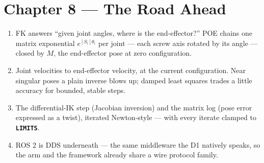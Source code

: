 \documentclass[11pt,twoside,openright]{book}
\newcommand{\code}[1]{\texttt{\bfseries #1}}
\begin{document}
\section{Chapter 8 --- The Road Ahead}

\begin{enumerate}
  \item FK answers ``given joint angles, where is the end-effector?''
    POE chains one matrix exponential $e^{[S_i]\theta_i}$ per joint ---
    each screw axis rotated by its angle --- closed by $M$, the
    end-effector pose at zero configuration.
  \item Joint velocities to end-effector velocity, at the current
    configuration. Near singular poses a plain inverse blows up; damped
    least squares trades a little accuracy for bounded, stable steps.
  \item The differential-IK step (Jacobian inversion) and the matrix log
    (pose error expressed as a twist), iterated Newton-style --- with
    every iterate clamped to \code{LIMITS}.
  \item ROS 2 is DDS underneath --- the same middleware the D1 natively
    speaks, so the arm and the framework already share a wire protocol
    family.
\end{enumerate}
\end{document}
